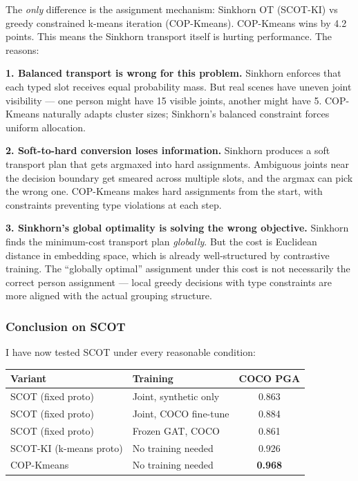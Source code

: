 The \emph{only} difference is the assignment mechanism: Sinkhorn OT (SCOT-KI) vs greedy constrained k-means iteration (COP-Kmeans). COP-Kmeans wins by 4.2 points. This means the Sinkhorn transport itself is hurting performance. The reasons:

\textbf{1. Balanced transport is wrong for this problem.} Sinkhorn enforces that each typed slot receives equal probability mass. But real scenes have uneven joint visibility --- one person might have 15 visible joints, another might have 5. COP-Kmeans naturally adapts cluster sizes; Sinkhorn's balanced constraint forces uniform allocation.

\textbf{2. Soft-to-hard conversion loses information.} Sinkhorn produces a soft transport plan that gets argmaxed into hard assignments. Ambiguous joints near the decision boundary get smeared across multiple slots, and the argmax can pick the wrong one. COP-Kmeans makes hard assignments from the start, with constraints preventing type violations at each step.

\textbf{3. Sinkhorn's global optimality is solving the wrong objective.} Sinkhorn finds the minimum-cost transport plan \emph{globally}. But the cost is Euclidean distance in embedding space, which is already well-structured by contrastive training. The ``globally optimal'' assignment under this cost is not necessarily the correct person assignment --- local greedy decisions with type constraints are more aligned with the actual grouping structure.

\subsubsection{Conclusion on SCOT}

I have now tested SCOT under every reasonable condition:

\begin{tabular}{llc}
\hline
\textbf{Variant} & \textbf{Training} & \textbf{COCO PGA} \\
\hline
SCOT (fixed proto) & Joint, synthetic only & 0.863 \\
SCOT (fixed proto) & Joint, COCO fine-tune & 0.884 \\
SCOT (fixed proto) & Frozen GAT, COCO & 0.861 \\
SCOT-KI (k-means proto) & No training needed & 0.926 \\
\hline
COP-Kmeans & No training needed & \textbf{0.968} \\
\hline
\end{tabular}

